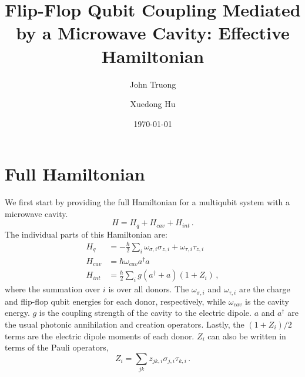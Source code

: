 \documentclass[
    preprint,
    amsmath,amssymb,
    aps,
    prb,
    floatfix,
]{revtex4-2}
\begin{document}
\title{Flip-Flop Qubit Coupling Mediated by a Microwave Cavity: Effective Hamiltonian}

\author{John Truong}
\author{Xuedong Hu}%

\date{\today}

\begin{abstract}
    
\end{abstract}

\maketitle

\section{Full Hamiltonian}
    We first start by providing the full Hamiltonian for a multiqubit system with a microwave cavity.
    \begin{equation}
        H = H_q + H_{cav} + H_{int} \,.
    \end{equation}
    The individual parts of this Hamiltonian are:
    \begin{align}
        H_q &= -\frac{\hbar}{2}\sum_{i} \omega_{\sigma,i} \sigma_{z,i} + \omega_{\tau,i} \tau_{z,i} \\
        H_{cav} &= \hbar\omega_{cav}a^\dagger a \\
        H_{int} &= \frac{\hbar}{2}\sum_i g(a^\dagger+a)(1+Z_i) \,,
    \end{align}
    where the summation over $i$ is over all donors. The $\omega_{\sigma,i}$ and $\omega_{\tau,i}$ are the charge and flip-flop qubit energies for each donor, respectively, while $\omega_{cav}$ is the cavity energy. $g$ is the coupling strength of the cavity to the electric dipole. $a$ and $a^\dagger$ are the usual photonic annihilation and creation operators. Lastly, the $(1+Z_i)/2$ terms are the electric dipole moments of each donor. $Z_i$ can also be written in terms of the Pauli operators,
    \begin{equation}
        Z_i = \sum_{jk}z_{jk,i}\sigma_{j,i}\tau_{k,i} \,.
    \end{equation}
\end{document}

